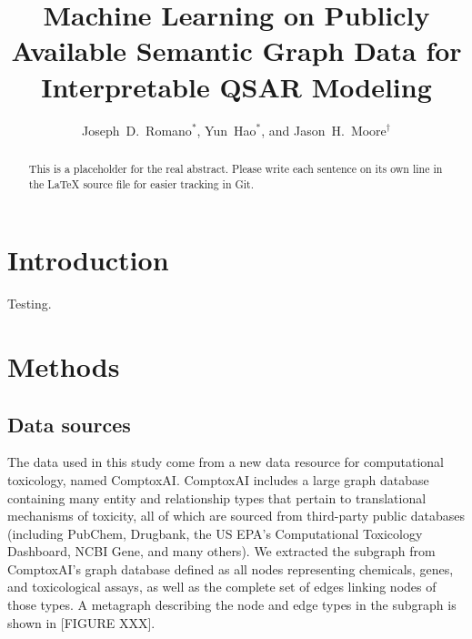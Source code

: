 \documentclass{ws-procs11x85}
\begin{document}
\title{Machine Learning on Publicly Available Semantic Graph Data for Interpretable QSAR Modeling}

\author{Joseph~D.~Romano$^*$, Yun~Hao$^*$, and Jason~H.~Moore$^\dag$}

\address{Institute for Biomedical Informatics, University of Pennsylvania,\\
Philadelphia, Pennsylvania 19104, United States\\
$^\dag$E-mail: jhmoore@upenn.edu\\
$^*$These authors contributed equally.}

\begin{abstract}
This is a placeholder for the real abstract.
Please write each sentence on its own line in the \LaTeX{} source file for easier tracking in Git.
\end{abstract}


\section{Introduction}\label{aba:sec1}
Testing.

\section{Methods}

\subsection{Data sources}
The data used in this study come from a new data resource for computational toxicology, named ComptoxAI.
ComptoxAI includes a large graph database containing many entity and relationship types that pertain to translational mechanisms of toxicity, all of which are sourced from third-party public databases (including PubChem, Drugbank, the US EPA's Computational Toxicology Dashboard, NCBI Gene, and many others).
We extracted the subgraph from ComptoxAI's graph database defined as all nodes representing chemicals, genes, and toxicological assays, as well as the complete set of edges linking nodes of those types.
A metagraph describing the node and edge types in the subgraph is shown in [FIGURE XXX].
\end{document}
